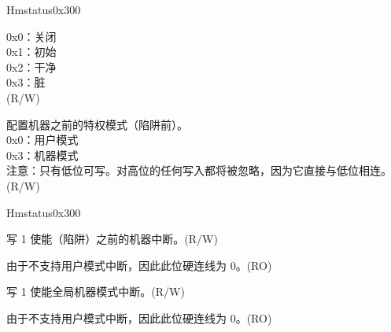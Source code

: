\begin{register}{H}{mstatus}{0x300}
\begin{regdesc}
\begin{reglist}
0x0：关闭\\
0x1：初始\\
0x2：干净\\
0x3：脏\\
(R/W)
\label{fielddesc:MSTATUSMPP}\item [MPP] 配置机器之前的特权模式（陷阱前）。\\
0x0：用户模式\\
0x3：机器模式\\
注意：只有低位可写。对高位的任何写入都将被忽略，因为它直接与低位相连。\\
(R/W)
\item [见下页……]
\end{reglist}\end{regdesc}
\end{register}
\addtocounter{Regfloat}{-1}
\begin{register}{H}{mstatus}{0x300}
\begin{regdesc}\begin{reglist}
\item [接上页……]
\label{fielddesc:MSTATUSMPIE}\item [MPIE] 写 1 使能（陷阱）之前的机器中断。(R/W)
\label{fielddesc:MSTATUSUPIE}\item [UPIE] 由于不支持用户模式中断，因此此位硬连线为 0。(RO)


\label{fielddesc:MSTATUSMIE}\item [MIE] 写 1 使能全局机器模式中断。(R/W)
\label{fielddesc:MSTATUSUIE}\item [UIE] 由于不支持用户模式中断，因此此位硬连线为 0。(RO)
\end{reglist}\end{regdesc}
\end{register}

